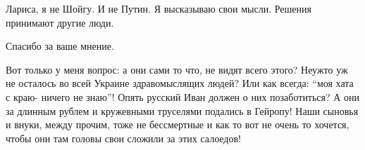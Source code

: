 \begin{itemize}
\begin{itemize} %

Лариса, я не Шойгу. И не Путин. Я высказываю свои мысли. Решения принимают
другие люди.

Спасибо за ваше мнение.
\end{itemize} %


Вот только у меня вопрос: а они сами то что, не видят всего этого? Неужто уж не
осталось во всей Украине здравомыслящих людей? Или как всегда: \enquote{моя хата с
краю- ничего не знаю}! Опять русский Иван должен о них позаботиться? А они за
длинным рублем и кружевными труселями подались в Гейропу! Наши сыновья и внуки,
между прочим, тоже не бессмертные и как то вот не очень то хочется, чтобы они
там головы свои сложили за этих салоедов!

\end{itemize} %
